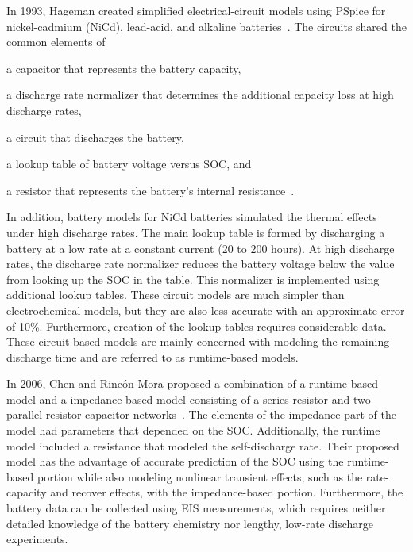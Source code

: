 \documentclass[../zhang_thesis.tex]{subfiles}
\begin{document}


In 1993, Hageman created simplified electrical-circuit models using PSpice for nickel-cadmium (NiCd), lead-acid, and alkaline batteries~\cite{hageman93}. The circuits shared the common elements of
\begin{enumerate*}[label=\emph{\roman*})]
\item a capacitor that represents the battery capacity,
\item a discharge rate normalizer that determines the additional capacity loss at high discharge rates,
\item a circuit that discharges the battery,
\item a lookup table of battery voltage versus SOC, and
\item a resistor that represents the battery's internal resistance~\cite{hageman93,hageman97}.
\end{enumerate*}
In addition, battery models for NiCd batteries simulated the thermal effects under high discharge rates. The main lookup table is formed by discharging a battery at a low rate at a constant current (20 to 200 hours). At high discharge rates, the discharge rate normalizer reduces the battery voltage below the value from looking up the SOC in the table. This normalizer is implemented using additional lookup tables. These circuit models are much simpler than electrochemical models, but they
are also less accurate with an approximate error of 10\%. Furthermore, creation of the lookup tables requires considerable data. These circuit-based models are mainly concerned with modeling the remaining discharge time and are referred to as runtime-based models.

In 2006, Chen and Rinc\'on-Mora proposed a combination of a runtime-based model and a impedance-based model consisting of a series resistor and two parallel resistor-capacitor networks~\cite{chen06}. The elements of the impedance part of the model had parameters that depended on the SOC. Additionally, the runtime model included a resistance that modeled the self-discharge rate. Their proposed model has the advantage of accurate prediction of the SOC using the runtime-based portion while also modeling
nonlinear transient effects, such as the rate-capacity and recover effects, with the impedance-based portion. Furthermore, the battery data can be collected using EIS measurements, which requires neither detailed knowledge of the battery chemistry nor lengthy, low-rate discharge experiments.
\end{document}
